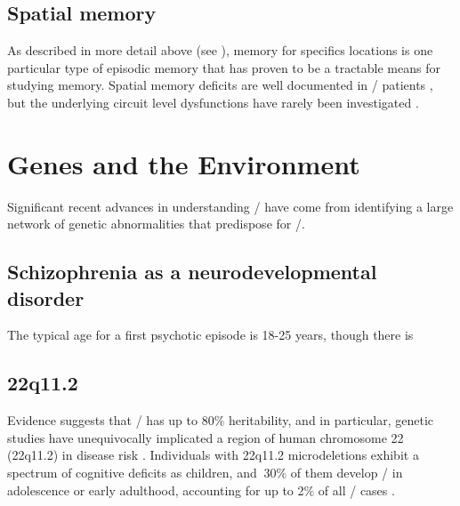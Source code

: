 \subsection{Spatial memory}
As described in more detail above (see ), memory for specifics locations is one particular type of episodic memory that has proven to be a tractable means for studying memory.
Spatial memory deficits are well documented in \scz/ patients \citep{Boyer2007, Hanlon2006, Aleman1999}, but the underlying circuit level dysfunctions have rarely been investigated \citep{Hayashi2015, Suh2013}.


\section{Genes and the Environment}\label{sec:intro:scz:genes_and_environment}
Significant recent advances in understanding \scz/ have come from identifying a large network of genetic abnormalities that predispose for \scz/.

\subsection{Schizophrenia as a neurodevelopmental disorder}\label{sec:intro:scz:neurodevelopment}

The typical age for a first psychotic episode is 18-25 years, though there is 

\subsection{22q11.2}
Evidence suggests that \scz/ has up to 80$\%$ heritability, and in particular, genetic studies have unequivocally implicated a region of human chromosome 22 (22q11.2) in disease risk \citep{Karayiorgou1995, Chow2006, Karayiorgou2010}.
Individuals with 22q11.2 microdeletions exhibit a spectrum of cognitive deficits as children, and $~$30$\%$ of them develop \scz/ in adolescence or early adulthood, accounting for up to 2$\%$ of all \scz/ cases \citep{Karayiorgou2010}.

